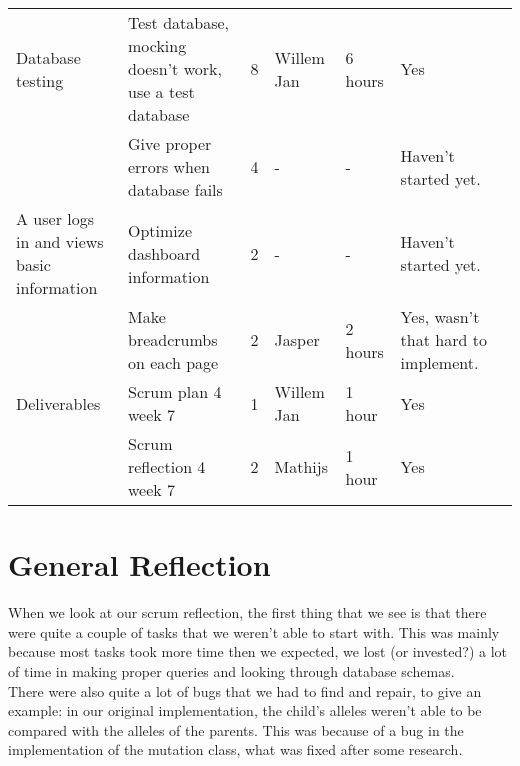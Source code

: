 \documentclass[a4paper]{report}
\begin{document}
\begin{landscape}
\begin{longtable}{p{3cm}|p{5cm}|l|l|l|l|p{7cm}}
Database testing & Test database, mocking doesn't work, use a test database & 8 & Willem Jan & 6 hours & Yes&\\
& Give proper errors when database fails & 4 & - & - & Haven't started yet. &\\
\hline

A user logs in and views basic information & Optimize dashboard information & 2 & - & - & Haven't started yet. &\\
& Make breadcrumbs on each page & 2 & Jasper & 2 hours & Yes, wasn't that hard to implement.&\\
\hline

Deliverables & Scrum plan 4 week 7 & 1 & Willem Jan & 1 hour& Yes&\\
& Scrum reflection 4 week 7 & 2 & Mathijs & 1 hour& Yes&\\
\hline
\end{longtable}
\end{landscape}

\section*{General Reflection}
When we look at our scrum reflection, the first thing that we see is that there were quite a couple of tasks that we weren't able to start with. This was mainly because most tasks took more time then we expected, we lost (or invested?) a lot of time in making proper queries and looking through database schemas. \\
There were also quite a lot of bugs that we had to find and repair, to give an example: in our original implementation, the child's alleles weren't able to be compared with the alleles of the parents. This was because of a bug in the implementation of the mutation class, what was fixed after some research. 
\end{document}
